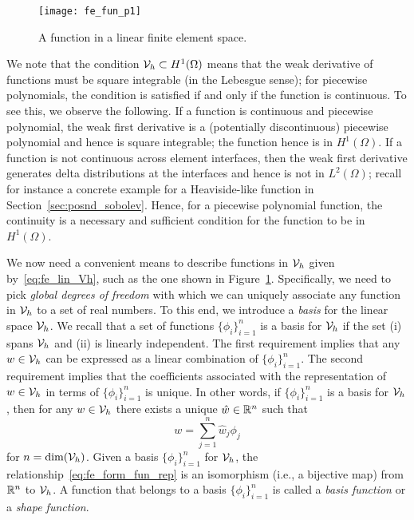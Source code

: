 

\begin{figure}
  \centering
  \texttt{[image: fe\_fun\_p1]}
  \caption{A function in a linear finite element space.}
  \label{fig:fe_fun_p1}
\end{figure}

We note that the condition $\mathcal{V}_h \subset H^1(\Omega)$ means that the weak derivative of functions must be square integrable (in the Lebesgue sense); for piecewise polynomials, the condition is satisfied if and only if the function is continuous.  To see this, we observe the following.  If a function is continuous and piecewise polynomial, the weak first derivative is a (potentially discontinuous) piecewise polynomial and hence is square integrable; the function hence is in $H^1(\Omega)$.  If a function is not continuous across element interfaces, then the weak first derivative generates delta distributions at the interfaces and hence is not in $L^2(\Omega)$; recall for instance a concrete example for a Heaviside-like function in Section~\ref{sec:posnd_sobolev}. Hence, for a piecewise polynomial function, the continuity is a necessary and sufficient condition for the function to be in $H^1(\Omega)$. 

We now need a convenient means to describe functions in $\mathcal{V}_h$ given by~\eqref{eq:fe_lin_Vh}, such as the one shown in Figure~\ref{fig:fe_fun_p1}.  Specifically, we need to pick \emph{global degrees of freedom} with which we can uniquely associate any function in $\mathcal{V}_h$ to a set of real numbers. To this end, we introduce a \emph{basis} for the linear space $\mathcal{V}_h$.  We recall that a set of functions $\{ \phi_i \}_{i=1}^n$ is a basis for $\mathcal{V}_h$ if the set (i) spans $\mathcal{V}_h$ and (ii) is linearly independent. The first requirement implies that any $w \in \mathcal{V}_h$ can be expressed as a linear combination of $\{ \phi_i \}_{i=1}^n$.  The second requirement implies that the coefficients associated with the representation of $w \in \mathcal{V}_h$ in terms of $\{ \phi_i \}_{i=1}^n$ is unique.  In other words, if $\{ \phi_i \}_{i=1}^n$ is a basis for $\mathcal{V}_h$, then for any $w \in \mathcal{V}_h$ there exists a unique $\hat w \in \mathbb{R}^n$ such that
\begin{equation}
  w = \sum_{j=1}^n \hat w_j \phi_j
  \label{eq:fe_form_fun_rep}
\end{equation}
for $n = \text{dim}(\mathcal{V}_h)$. Given a basis $\{ \phi_i \}_{i=1}^{n}$ for $\mathcal{V}_h$, the relationship~\eqref{eq:fe_form_fun_rep} is an isomorphism (i.e., a bijective map) from $\mathbb{R}^n$ to $\mathcal{V}_h$.  A function that belongs to a basis $\{ \phi_i \}_{i=1}^n$ is called a \emph{basis function} or a \emph{shape function}.


